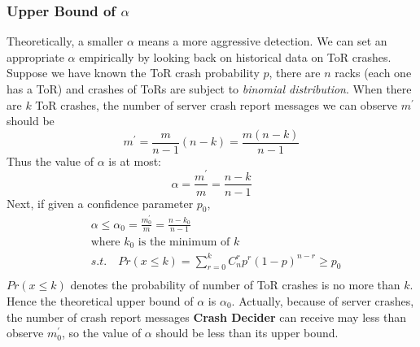 \documentclass{sig-alternate-05-2015}
\begin{document}
\subsubsection*{Upper Bound of $\alpha$}
Theoretically, a smaller $\alpha$ means a more aggressive detection. We can set an appropriate $\alpha$ empirically by looking back on historical data on ToR crashes. Suppose we have known the ToR crash probability $p$, there are $n$ racks (each one has a ToR) and crashes of ToRs are subject to \textit{binomial distribution}. When there are $k$ ToR crashes, the number of server crash report messages we can observe $m^\prime$ should be 
\begin{equation}
    m^\prime  = \frac{m}{n-1}(n-k) = \frac{m(n-k)}{n-1}
\end{equation}
Thus the value of $\alpha$ is at most:
\begin{equation}
    \alpha  = \frac{m^\prime}{m} = \frac{n-k}{n-1}
\end{equation}
Next, if given a confidence parameter $p_0$,
\begin{equation}
    \begin{aligned}
        &\alpha \leq \alpha_0  = \frac{m_0^\prime}{m} = \frac{n-k_0}{n-1}\\
        &\text{where } k_0 \text{ is the minimum of } k\\
        & s.t. \quad Pr(x\leq k) = \sum_{r=0}^k C_n^r p^r(1-p)^{n-r} \geq p_0 \\
    \end{aligned}
\end{equation}
$Pr(x\leq k)$ denotes the probability of number of ToR crashes is no more than $k$. Hence the theoretical upper bound of $\alpha$ is $\alpha_0$. Actually, because of server crashes, the number of crash report messages \textbf{Crash Decider} can receive may less than observe $m_0^\prime$, so the value of $\alpha$ should be less than its upper bound.
 
\end{document}
